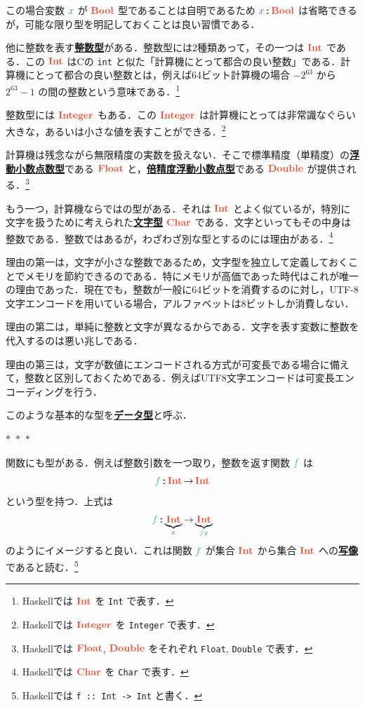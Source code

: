\documentclass[a5paper,twoside,fleqn,draft]{jsbook}
\def\varColor{NavyBlue}
\def\funcColor{BlueGreen}
\def\typeColor{RedOrange}
\newcommand{\separator}{\begin{center}$*$~$*$~$*$\end{center}}
\newcommand{\programminglanguage}[1]{\textsf{#1}}
\newcommand{\clang}{\programminglanguage{C}}
\newcommand{\haskell}{\programminglanguage{Haskell}}
\newcommand{\keyword}[1]{{\underline{\textbf{#1}}}}
\newcommand{\code}[1]{\texttt{#1}}
\newcommand{\mVar}[1]{\textcolor{\varColor}{#1}}
\newcommand{\mXVar}{\mVar{x}}
\newcommand{\mFunc}[1]{\textcolor{\funcColor}{#1}}
\newcommand{\mFFunc}{{\mFunc{f}}}
\DeclareMathOperator{\mFuncArrow}{\rightarrow}
\DeclareMathOperator{\mIn}{{:\!:}}
\newcommand{\mType}[1]{\textcolor{\typeColor}{\mathbf{#1}}}
\newcommand{\mBoolType}{\mType{Bool}}
\newcommand{\mCharType}{\mType{Char}}
\newcommand{\mFloatType}{\mType{Float}}
\newcommand{\mDoubleType}{\mType{Double}}
\newcommand{\mIntType}{\mType{Int}}
\newcommand{\mIntegerType}{\mType{Integer}}
\begin{document}
この場合変数 $\mXVar$ が $\mBoolType$ 型であることは自明であるため $\mXVar\mIn\mBoolType$ は省略できるが，可能な限り型を明記しておくことは良い習慣である．

他に整数を表す\keyword{整数型}がある．整数型には2種類あって，その一つは $\mIntType$ である．この $\mIntType$ は\clang の \code{int} と似た「計算機にとって都合の良い整数」である．計算機にとって都合の良い整数とは，例えば64ビット計算機の場合 $-2^{63}$ から $2^{63}-1$ の間の整数という意味である．\footnote{\haskell では $\mIntType$ を \code{Int} で表す．}

整数型には $\mIntegerType$ もある．この $\mIntegerType$ は計算機にとっては非常識なぐらい大きな，あるいは小さな値を表すことができる．\footnote{\haskell では $\mIntegerType$ を \code{Integer} で表す．}

計算機は残念ながら無限精度の実数を扱えない．そこで標準精度（単精度）の\keyword{浮動小数点数型}である $\mFloatType$ と，\keyword{倍精度浮動小数点型}である $\mDoubleType$ が提供される．\footnote{\haskell では $\mFloatType$, $\mDoubleType$ をそれぞれ \code{Float}, \code{Double} で表す．}

もう一つ，計算機ならではの型がある．それは $\mIntType$ とよく似ているが，特別に文字を扱うために考えられた\keyword{文字型} $\mCharType$ である．文字といってもその中身は整数である．整数ではあるが，わざわざ別な型とするのには理由がある．\footnote{\haskell では $\mCharType$ を \code{Char} で表す．}

理由の第一は，文字が小さな整数であるため，文字型を独立して定義しておくことでメモリを節約できるのである．特にメモリが高価であった時代はこれが唯一の理由であった．現在でも，整数が一般に64ビットを消費するのに対し，UTF-8文字エンコードを用いている場合，アルファベットは8ビットしか消費しない．

理由の第二は，単純に整数と文字が異なるからである．文字を表す変数に整数を代入するのは悪い兆しである．

理由の第三は，文字が数値にエンコードされる方式が可変長である場合に備えて，整数と区別しておくためである．例えばUTF8文字エンコードは可変長エンコーディングを行う．

このような基本的な型を\keyword{データ型}と呼ぶ．

\separator

関数にも型がある．例えば整数引数を一つ取り，整数を返す関数 $\mFFunc$ は
\begin{equation}
  \mFFunc
  \mIn\mIntType
  \mFuncArrow\mIntType
\end{equation}
という型を持つ．上式は
\begin{equation}
  \mFFunc
  \mIn\underbrace{\mIntType}_{\mXVar}
  \mFuncArrow\underbrace{\mIntType}_{\mFFunc\mXVar}
\end{equation}
のようにイメージすると良い．これは関数 $\mFFunc$ が集合 $\mIntType$ から集合 $\mIntType$ への\keyword{写像}であると読む．\footnote{\haskell では \code{f :: Int -> Int} と書く．}
\end{document}
